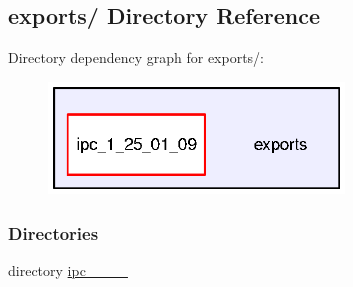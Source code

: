 \subsection{exports/ Directory Reference}
\label{dir_2298ed0e5bfee6f293aea6c715ac7f7c}
Directory dependency graph for exports/\-:
\nopagebreak
\begin{figure}[H]
\begin{center}
\leavevmode
\includegraphics[width=223pt]{dir_2298ed0e5bfee6f293aea6c715ac7f7c_dep}
\end{center}
\end{figure}
\subsubsection*{Directories}
\begin{DoxyCompactItemize}
\item 
directory \hyperlink{dir_3e5426f237af51a615cd732bd4247ee5}{ipc\-\_\-\_\-\_\-\_}
\end{DoxyCompactItemize}

